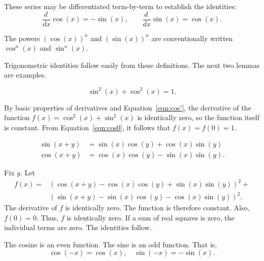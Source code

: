 These series may be differentiated term-by-term to establish the identities:
%
    \begin{equation}\label{eqn:cos'}
    \frac{d\phantom{~}} {dx}\cos(x) = -\sin(x),\qquad \frac{ d\phantom{~} }{dx}\sin(x) = \cos(x).
    \end{equation}

The powers $(\cos(x))^n$ and $(\sin(x))^n$ are conventionally written
$\cos^n(x)$ and $\sin^n(x)$.

Trigonometric identities follow easily from these definitions.  The next two lemmas are examples.
%

\begin{lemma}\label{lemma:circle} 
   $$\sin^2(x) + \cos^2(x) = 1.$$
\end{lemma}
%

\begin{proved}
By basic properties of derivatives and Equation~\ref{eqn:cos'},
the derivative of the function $f(x) = \cos^2(x) +\sin^2(x)$ is
identically zero, so the function itself is constant.  From
Equation~\ref{eqn:cos0}, it follows that $f(x)=f(0)=1$.
\swallowed\end{proved}


\begin{lemma}\label{lemma:sin-add}
  $$\begin{array}{lll}
  \sin(x+y) &= \sin(x)\cos(y) + \cos(x)\sin(y)\\
  \cos(x+y)  &= \cos(x)\cos(y) - \sin(x)\sin(y).
  \end{array}$$
\end{lemma}
%

\begin{proved}
Fix $y$.  Let
    $$\begin{array}{lll}
    f(x) = &(\cos(x+y) - \cos(x)\cos(y) +
    \sin(x)\sin(y))^2 +\\ & (\sin(x+y) -\sin(x)\cos(y) -
    \cos(x)\sin(y))^2.
    \end{array}$$
The derivative of $f$ is identically zero.  The function is
therefore constant. Also, $f(0)=0$.  Thus, $f$ is identically zero.
If a sum of real squares is zero, the individual terms are zero. The
identities follow.
\swallowed\end{proved}

\begin{lemma}\label{lemma:cos-neg}
The cosine is an even function.  The sine is an odd
function.  That is,
    $$\cos(-x) = \cos(x),\quad\sin(-x) = -\sin(x).$$
\end{lemma}
%
%
%


